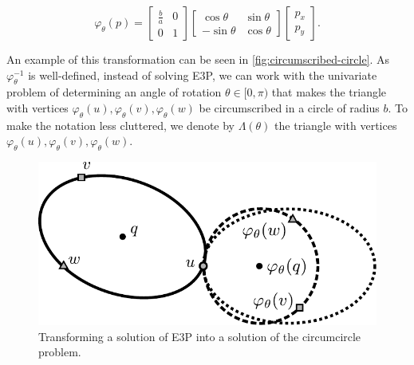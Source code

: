 \color{blue}
\begin{equation*}%
\varphi_\theta(p)=\left[\begin{array}{cc}
\frac{b}{a}&0\\
0&1
\end{array}\right]
\left[\begin{array}{cc}
\cos{\theta}&\sin{\theta}\\
-\sin{\theta}&\cos{\theta}
\end{array}\right]\left[\begin{array}{c}
p_x\\
p_y
\end{array}\right].
\end{equation*}
\color{black}

An example of this transformation can be seen in \autoref{fig:circumscribed-circle}. As {\color{blue} $\varphi_\theta^{-1}$} is well-defined, instead of solving E3P, we can work with the univariate problem of determining an angle of rotation $\theta \in [0, \pi)$ that makes the triangle with vertices {\color{blue}$\varphi_\theta(u), \varphi_\theta(v), \varphi_\theta(w)$} be circumscribed in a circle of radius $b$. To make the notation less cluttered, we denote by $\Lambda(\theta)$ the triangle with vertices {\color{blue}$\varphi_\theta(u), \varphi_\theta(v), \varphi_\theta(w)$}.

\begin{figure}[!htb]
	\centering
	
	\includegraphics[scale=.8]{figures/circumscribed-circle}
	\caption{Transforming a solution of E3P into a solution of the circumcircle problem.}
	\label{fig:circumscribed-circle}
\end{figure}

